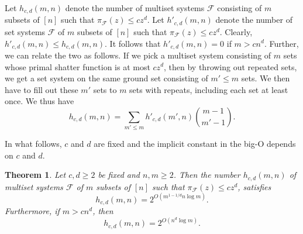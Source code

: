 \documentclass[11pt]{article}
\theoremstyle{plain}
\newtheorem{theorem}{Theorem}[section]
\theoremstyle{definition}
\theoremstyle{remark}
\begin{document}
 

Let $h_{c,d}(m,n)$ denote the number of multiset systems $\mathcal{F}$ consisting of $m$ subsets of $[n]$ such that $\pi_{\mathcal{F}}(z) \leq cz^d$.   Let $h'_{c,d}(m,n)$ denote the number of set systems $\mathcal{F}$ of $m$ subsets of $[n]$ such that $\pi_{\mathcal{F}}(z) \leq cz^d$.  Clearly, $h'_{c,d}(m,n) \leq h_{c,d}(m,n)$.  It follows that $h'_{c,d}(m,n)=0$ if $m > cn^d$. Further, we can relate the two as follows. If we pick a multiset system consisting of $m$ sets whose primal shatter function is at most $cz^d$, then by throwing out repeated sets, we get a set system on the same ground set consisting of $m' \leq m$ sets. We then have to fill out these $m'$ sets to $m$ sets with repeats, including each set at least once. We thus have \begin{equation}\label{hfromh'} h_{c,d}(m,n)=\sum_{m' \leq m}h'_{c,d}(m',n){m-1 \choose m'-1}.
 \end{equation}

In what follows, $c$ and $d$ are fixed and the implicit constant in the big-O depends on $c$ and $d$. 

\begin{theorem}\label{vc}
Let $c,d \geq 2$ be fixed and $n,m \geq 2$. Then the number $h_{c,d}(m,n)$ of multiset systems $\mathcal{F}$ of $m$ subsets of $[n]$ such that $\pi_{\mathcal{F}}(z) \leq cz^d$,  satisfies $$h_{c,d}(m,n) = 2^{O(m^{1-1/d}n\log m)}.$$ Furthermore, if $m > cn^d$, then $$h_{c,d}(m,n)=2^{O(n^d\log m)}.$$
 \end{theorem}
\end{document}
